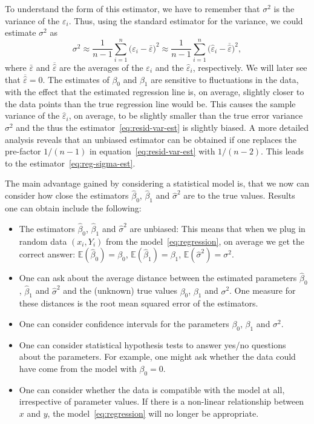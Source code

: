 \documentclass[
  a4paper,
]{article}
\theoremstyle{definition}
\theoremstyle{definition}
\theoremstyle{definition}
\theoremstyle{definition}
\theoremstyle{remark}
\begin{document}
To understand the form of this estimator, we have to remember that
\(\sigma^2\) is the variance of the \(\varepsilon_i\). Thus, using the standard
estimator for the variance, we could estimate \(\sigma^2\) as
\begin{equation}
  \sigma^2
  \approx \frac{1}{n-1} \sum_{i=1}^n \bigl(\varepsilon_i - \bar\varepsilon\bigr)^2
  \approx \frac{1}{n-1} \sum_{i=1}^n \bigl(\hat\varepsilon_i - \overline{\hat\varepsilon}\bigr)^2,
  \label{eq:resid-var-est}
\end{equation}
where \(\bar\varepsilon\) and \(\overline{\hat\varepsilon}\) are the averages of the
\(\varepsilon_i\) and the \(\hat\varepsilon_i\), respectively. We will later see that
\(\overline{\hat\varepsilon} = 0\). The estimates of \(\beta_0\) and \(\beta_1\) are
sensitive to fluctuations in the data, with the effect that the
estimated regression line is, on average, slightly closer to the data
points than the true regression line would be. This causes the sample
variance of the \(\hat\varepsilon_i\), on average, to be slightly smaller than
the true error variance \(\sigma^2\) and the thus the
estimator~\eqref{eq:resid-var-est} is slightly biased. A more
detailed analysis reveals that an unbiased estimator can be obtained
if one replaces the pre-factor \(1/(n-1)\) in equation~\eqref{eq:resid-var-est}
with \(1/(n-2)\). This leads to the estimator~\eqref{eq:reg-sigma-est}.

The main advantage gained by considering a statistical model is, that
we now can consider how close the estimators \(\hat\beta_0\), \(\hat\beta_1\)
and \(\hat\sigma^2\) are to the true values. Results one can obtain
include the following:

\begin{itemize}
\item
  The estimators \(\hat\beta_0\), \(\hat\beta_1\) and \(\hat\sigma^2\)
  are unbiased: This means that when we plug in random data
  \((x_i, Y_i)\) from the model~\eqref{eq:regression}, on
  average we get the correct answer: \(\mathbb{E}(\hat\beta_0) = \beta_0\),
  \(\mathbb{E}(\hat\beta_1) = \beta_1\), \(\mathbb{E}(\hat\sigma^2) = \sigma^2\).
\item
  One can ask about the average distance between the estimated
  parameters \(\hat\beta_0\), \(\hat\beta_1\) and \(\hat\sigma^2\)
  and the (unknown) true values \(\beta_0\), \(\beta_1\) and \(\sigma^2\).
  One measure for these distances is the root mean squared error
  of the estimators.
\item
  One can consider confidence intervals for the parameters
  \(\beta_0\), \(\beta_1\) and \(\sigma^2\).
\item
  One can consider statistical hypothesis tests to answer
  yes/no questions about the parameters. For example, one might ask
  whether the data could have come from the model with \(\beta_0=0\).
\item
  One can consider whether the data is compatible with the model
  at all, irrespective of parameter values. If there is a non-linear
  relationship between \(x\) and \(y\), the model~\eqref{eq:regression}
  will no longer be appropriate.
\end{itemize}
\end{document}

